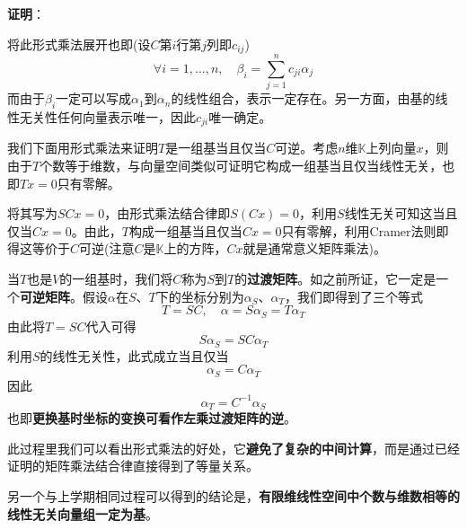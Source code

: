 \documentclass[a4paper,UTF8,fontset=windows,AutoFakeBold]{ctexart}
\newcommand*{\note}{\noindent *}
\newcommand{\proo}[1]{{\vspace{5pt}\kaishu\noindent\textbf{证明}：\vspace{-3pt}
\begin{compactitem}
    \item[] #1
\end{compactitem}
}}
\begin{document}
\proo{
    将此形式乘法展开也即(设$C$第$i$行第$j$列即$c_{ij}$)
    $$\forall i=1,\dots,n,\quad\beta_i=\sum_{j=1}^nc_{ji}\alpha_j$$
    而由于$\beta_i$一定可以写成$\alpha_1$到$\alpha_n$的线性组合，表示一定存在。另一方面，由基的线性无关性任何向量表示唯一，因此$c_{ji}$唯一确定。

    我们下面用形式乘法来证明$T$是一组基当且仅当$C$可逆。考虑$n$维$\mathbb{K}$上列向量$x$，则由于$T$个数等于维数，与向量空间类似可证明它构成一组基当且仅当线性无关，也即$Tx=0$只有零解。

    将其写为$SCx=0$，由形式乘法结合律即$S(Cx)=0$，利用$S$线性无关可知这当且仅当$Cx=0$。由此，$T$构成一组基当且仅当$Cx=0$只有零解，利用Cramer法则即得这等价于$C$可逆(注意$C$是$\mathbb{K}$上的方阵，$Cx$就是通常意义矩阵乘法)。
}

当$T$也是$V$的一组基时，我们将$C$称为$S$到$T$的\textbf{过渡矩阵}。如之前所证，它一定是一个\textbf{可逆矩阵}。假设$\alpha$在$S$、$T$下的坐标分别为$\alpha_S$、$\alpha_T$，我们即得到了三个等式
$$T=SC,\quad\alpha=S\alpha_S=T\alpha_T$$
由此将$T=SC$代入可得
$$S\alpha_S=SC\alpha_T$$
利用$S$的线性无关性，此式成立当且仅当
$$\alpha_S=C\alpha_T$$
因此
$$\alpha_T=C^{-1}\alpha_S$$
也即\textbf{更换基时坐标的变换可看作左乘过渡矩阵的逆}。

\note 此过程里我们可以看出形式乘法的好处，它\textbf{避免了复杂的中间计算}，而是通过已经证明的矩阵乘法结合律直接得到了等量关系。

\note 另一个与上学期相同过程可以得到的结论是，\textbf{有限维线性空间中个数与维数相等的线性无关向量组一定为基}。
\end{document}
